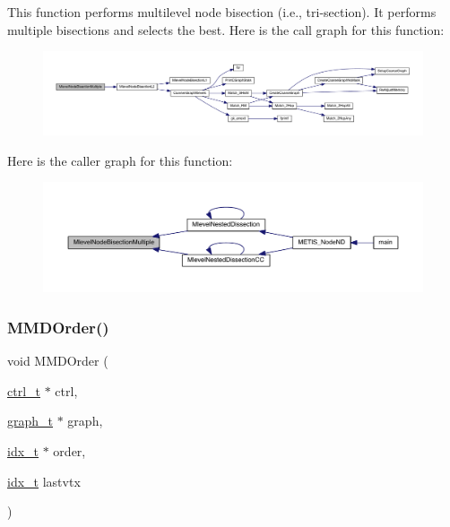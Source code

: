 This function performs multilevel node bisection (i.\+e., tri-\/section). It performs multiple bisections and selects the best. Here is the call graph for this function\+:\nopagebreak
\begin{figure}[H]
\begin{center}
\leavevmode
\includegraphics[width=350pt]{a00933_a59c8030c5429e219a8535c2a11cef724_cgraph}
\end{center}
\end{figure}
Here is the caller graph for this function\+:\nopagebreak
\begin{figure}[H]
\begin{center}
\leavevmode
\includegraphics[width=350pt]{a00933_a59c8030c5429e219a8535c2a11cef724_icgraph}
\end{center}
\end{figure}
\mbox{\label{a00933_acafb70c0e49cde8105dc62f6c34dfa6c}} 
\subsubsection{\texorpdfstring{M\+M\+D\+Order()}{MMDOrder()}}
{\footnotesize\ttfamily void M\+M\+D\+Order (\begin{DoxyParamCaption}\item[{\hyperlink{a00742}{ctrl\+\_\+t} $\ast$}]{ctrl,  }\item[{\hyperlink{a00734}{graph\+\_\+t} $\ast$}]{graph,  }\item[{\hyperlink{a00876_aaa5262be3e700770163401acb0150f52}{idx\+\_\+t} $\ast$}]{order,  }\item[{\hyperlink{a00876_aaa5262be3e700770163401acb0150f52}{idx\+\_\+t}}]{lastvtx }\end{DoxyParamCaption})}


